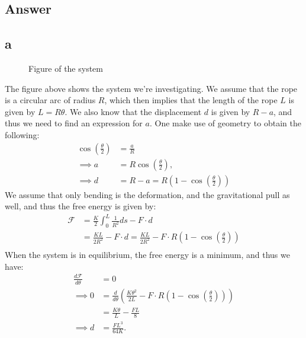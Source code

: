 \documentclass[a4paper]{article}
\begin{document}
\subsection*{Answer}
\subsection*{a}
\begin{figure}[H]
    \centering
    \caption{Figure of the system}
\end{figure}\noindent
The figure above shows the system we're investigating. We assume that the rope is a circular arc of radius $R$, which then implies that the length of the rope $L$ is given by $L = R\theta$.
We also know that the displacement $d$ is given by $R - a$, and thus we need to find an expression for $a$. One make use of geometry to obtain the following:
\begin{align*}
    \cos\left(\frac{\theta}{2}\right) &= \frac{a}{R}\\
    \implies a &= R\cos\left(\frac{\theta}{2}\right),\\
    \implies d &= R - a = R\left(1 - \cos\left(\frac{\theta}{2}\right)\right)
\end{align*}We assume that only bending is the deformation, and the gravitational pull as well, and thus the free energy is given by:
\begin{align*}
    \mathcal{F} &= \frac{K}{2}\int_0^L\frac{1}{R^2}ds - F\cdot d\\
    &=\frac{KL}{2R^2} - F\cdot d =\frac{KL}{2R^2} - F\cdot R\left(1 - \cos\left(\frac{\theta}{2}\right)\right)\\
\end{align*}When the system is in equilibrium, the free energy is a minimum, and thus we have:
\begin{align*}
    \frac{d\mathcal{F}}{d\theta} &= 0\\
    \implies 0&= \frac{d}{d\theta}\left(\frac{K\theta^2}{2L} - F\cdot R\left(1 - \cos\left(\frac{\theta}{2}\right)\right)\right)\\
    &= \frac{K\theta}{L} - \frac{FL}{8}\\
    \implies d &= \frac{FL^3}{64K}.
\end{align*}
\end{document}
